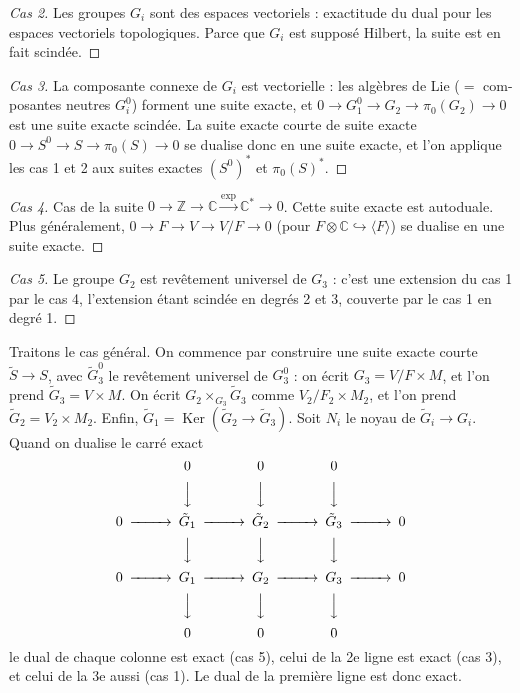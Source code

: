 \documentclass[12pt,a4paper]{article}
\theoremstyle{plain}
\theoremstyle{definition}
\theoremstyle{remark}
\DeclareMathOperator{\Ker}{Ker}
\newcommand{\Z}{\mathbb{Z}}
\newcommand{\C}{\mathbb{C}}
\providecommand{\Ker}{\operatorname{Ker}}
\begin{document}
\begin{proof}[Cas 2]
Les groupes $G_i$ sont des espaces vectoriels : exactitude du dual pour les
espaces vectoriels topologiques. Parce que $G_i$ est supposé Hilbert, la suite est en fait
scindée.
\end{proof}

\begin{proof}[Cas 3]
La composante connexe de $G_i$ est vectorielle : les algèbres de Lie ($=$ com-
posantes neutres $G_i^0$) forment une suite exacte, et $0 \to G_1^0 \to G_2 \to \pi_0(G_2) \to 0$ est une
suite exacte scindée. La suite exacte courte de suite exacte $0 \to S^0 \to S \to \pi_0(S) \to 0$
se dualise donc en une suite exacte, et l'on applique les cas 1 et 2 aux suites exactes $(S^0)^*$
et $\pi_0(S)^*$.
\end{proof}

\begin{proof}[Cas 4]
Cas de la suite $0 \to \Z \to \C \xrightarrow{\exp} \C^* \to 0$. Cette suite exacte est autoduale.
Plus généralement, $0 \to F \to V \to V/F \to 0$ (pour $F \otimes \C \hookrightarrow \langle F \rangle$) se dualise en une
suite exacte.
\end{proof}

\begin{proof}[Cas 5]
Le groupe $G_2$ est revêtement universel de $G_3$ : c'est une extension du cas 1
par le cas 4, l'extension étant scindée en degrés 2 et 3, couverte par le cas 1 en degré 1.
\end{proof}

Traitons le cas général. On commence par construire une suite exacte courte $\tilde{S} \to S$,
avec $\tilde{G}_3^0$ le revêtement universel de $G_3^0$ : on écrit $G_3 = V/F \times M$,
et l'on prend $\tilde{G}_3 = V \times M$. On écrit $G_2 \times_{G_3} \tilde{G}_3$ comme $V_2/F_2 \times M_2$, et l'on prend
$\tilde{G}_2 = V_2 \times M_2$. Enfin, $\tilde{G}_1 = \Ker(\tilde{G}_2 \to \tilde{G}_3)$. Soit $N_i$ le noyau de $\tilde{G}_i \to G_i$. Quand
on dualise le carré exact
\[
\begin{CD}
@. 0 @. 0 @. 0 \\
@. @VVV @VVV @VVV \\
0 @>>> \tilde{G}_1 @>>> \tilde{G}_2 @>>> \tilde{G}_3 @>>> 0 \\
@. @VVV @VVV @VVV \\
0 @>>> G_1 @>>> G_2 @>>> G_3 @>>> 0 \\
@. @VVV @VVV @VVV \\
@. 0 @. 0 @. 0
\end{CD}
\]
le dual de chaque colonne est exact (cas 5), celui de la 2e ligne est exact (cas 3), et celui
de la 3e aussi (cas 1). Le dual de la première ligne est donc exact.
\end{document}
